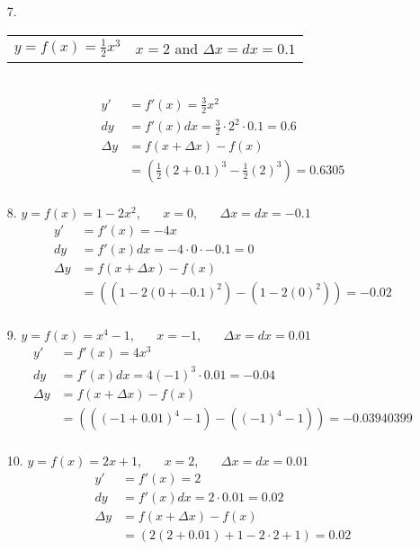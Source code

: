 \documentclass[12pt]{article}
\begin{document}

    \begin{enumerate}
        \item[7.]
            \begin{tabular}[t]{@{}p{.5\linewidth}l}
                $y = f(x)=\frac{1}{2}x^3$ & $x=2$ and $\Delta{x}= dx = 0.1$
            \end{tabular}\\
            \begin{align*}
            y' & = f'(x) =\frac{3}{2}x^2 \\
            dy & = f'(x)dx = \frac{3}{2} \cdot 2^2 \cdot 0.1 = 0.6\\
            \Delta{y} &= f(x+\Delta{x}) - f(x)\\
            &= \left(\frac{1}{2}(2+0.1)^3 - \frac{1}{2}(2)^3 \right) = 0.6305\\
            \end{align*}
            

        \item[8.] $y = f(x)=1-2x^2$,~~~ $x=0$,~~~ $\Delta{x}= dx = -0.1$\\
            \begin{align*}
            y' & = f'(x)=-4x \\
            dy & = f'(x)dx = -4 \cdot 0 \cdot -0.1 = 0\\
            \Delta{y} & = f(x+\Delta{x}) - f(x)\\ 
            &= \left((1-2(0+-0.1)^2) - (1-2(0)^2)\right) = -0.02\\
            \end{align*}

        \item[9.] $y = f(x)=x^4-1$,~~~ $x=-1$,~~~ $\Delta{x} = dx = 0.01$\\
            \begin{align*}
            y' &= f'(x)=4x^3 \\
            dy &= f'(x)dx = 4(-1)^3 \cdot 0.01 = -0.04\\
            \Delta{y} &= f(x+\Delta{x}) - f(x)\\
            &= \left(((-1+0.01)^4 - 1) - ((-1)^4 - 1)\right) = -0.03940399\\
            \end{align*}

        \item[10.] $y = f(x)=2x+1$,~~~ $x=2$,~~~ $\Delta{x} = dx = 0.01$\\
            \begin{align*}
            y' &= f'(x)= 2 \\
            dy &= f'(x)dx = 2 \cdot 0.01 = 0.02\\
            \Delta{y} &= f(x+\Delta{x}) - f(x)\\
            &= \left( 2(2+0.01)+1 - 2\cdot2+1 \right) = 0.02\\
            \end{align*}

    \end{enumerate}
\end{document}
